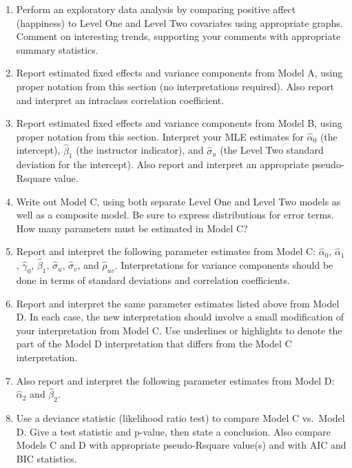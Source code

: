 \documentclass[
]{krantz}
\providecommand{\tightlist}{%
  \setlength{\itemsep}{0pt}\setlength{\parskip}{0pt}}
\begin{document}
\begin{enumerate}
  \begin{enumerate}
  \def\labelenumii{\arabic{enumii}.}
  \tightlist
  \item
    Perform an exploratory data analysis by comparing positive affect (happiness) to Level One and Level Two covariates using appropriate graphs. Comment on interesting trends, supporting your comments with appropriate summary statistics.
  \item
    Report estimated fixed effects and variance components from Model A, using proper notation from this section (no interpretations required). Also report and interpret an intraclass correlation coefficient.
  \item
    Report estimated fixed effects and variance components from Model B, using proper notation from this section. Interpret your MLE estimates for \(\hat{\alpha}_{0}\) (the intercept), \(\hat{\beta}_{1}\) (the instructor indicator), and \(\hat{\sigma}_{u}\) (the Level Two standard deviation for the intercept). Also report and interpret an appropriate pseudo-Rsquare value.
  \item
    Write out Model C, using both separate Level One and Level Two models as well as a composite model. Be sure to express distributions for error terms. How many parameters must be estimated in Model C?
  \item
    Report and interpret the following parameter estimates from Model C: \(\hat{\alpha}_{0}\), \(\hat{\alpha}_{1}\), \(\hat{\gamma}_{0}\), \(\hat{\beta}_{1}\), \(\hat{\sigma}_{u}\), \(\hat{\sigma}_{v}\), and \(\hat{\rho}_{uv}\). Interpretations for variance components should be done in terms of standard deviations and correlation coefficients.
  \item
    Report and interpret the same parameter estimates listed above from Model D. In each case, the new interpretation should involve a small modification of your interpretation from Model C. Use underlines or highlights to denote the part of the Model D interpretation that differs from the Model C interpretation.
  \item
    Also report and interpret the following parameter estimates from Model D: \(\hat{\alpha}_{2}\) and \(\hat{\beta}_{2}\).
  \item
    Use a deviance statistic (likelihood ratio test) to compare Model C vs.~Model D. Give a test statistic and p-value, then state a conclusion. Also compare Models C and D with appropriate pseudo-Rsquare value(s) and with AIC and BIC statistics.
  \end{enumerate}
\end{enumerate}
\end{document}
